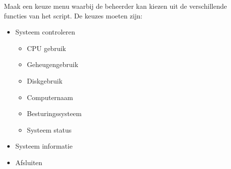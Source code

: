 Maak een keuze menu waarbij de beheerder kan kiezen uit de verschillende functies van het script. De keuzes moeten zijn:
\begin{itemize}
\item Systeem controleren
	\begin{itemize}
	\item CPU gebruik
	\item Geheugengebruik
	\item Diskgebruik
	\item Computernaam
	\item Besturingssysteem
	\item Systeem status
	\end{itemize}
\item Systeem informatie
\item Afsluiten
\end{itemize}

